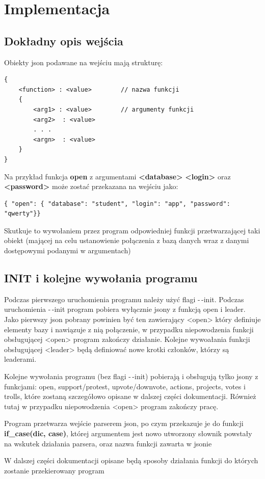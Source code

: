 \documentclass{article}
\begin{document}
\newpage
\section{Implementacja}




\subsection{Dokładny opis wejścia } 
Obiekty json podawane na wejściu mają strukturę: 
\begin{verbatim}
{     
    <function> : <value>        // nazwa funkcji 
    {
        <arg1> : <value>        // argumenty funkcji
        <arg2>  : <value> 
        . . . 
        <argn>  : <value> 
    }
}
\end{verbatim}
Na przykład funkcja \textbf{open} z argumentami \textbf{<database>} \textbf{<login>} oraz \textbf{<password>} może zostać przekazana na wejściu jako:
\begin{verbatim}
{ "open": { "database": "student", "login": "app", "password": "qwerty"}}
\end{verbatim}
Skutkuje to wywołaniem przez program odpowiedniej funkcji przetwarzającej taki obiekt (mającej na celu ustanowienie połączenia z bazą danych wraz z danymi dostępowymi podanymi w argumentach)




\subsection{INIT i kolejne wywołania programu}
Podczas pierwszego uruchomienia programu należy użyć flagi -\,-init.
Podczas uruchomienia -\,-init program pobiera wyłącznie jsony z funkcją open i leader.
Jako pierwszy json pobrany powinien być ten zawierający <open> który definiuje elementy bazy i nawiązuje z nią połączenie,
w przypadku niepowodzenia funkcji obsługującej <open> program zakończy działanie. \newline
Kolejne wywoałania funkcji obsługującej <leader> będą definiować nowe krotki członków, którzy są leaderami. 

Kolejne wywołania programu (bez flagi -\,-init) pobierają i obsługują tylko jsony z funkcjami: 
open, support/protest, upvote/downvote, actions, projects, votes i trolls, 
które zostaną szczegółowo opisane w dalszej części dokumentacji.
Również tutaj w przypadku niepowodzenia <open> program zakończy pracę.  

Program przetwarza wejście parserem json, po czym przekazuje je do funkcji \textbf{if\_case(dic, case)}, 
której argumentem jest nowo utworzony słownik powstały na wskutek działania parsera, oraz nazwa funkcji zawarta w jsonie

W dalszej części dokumentacji opisane będą sposoby działania funkcji do których zostanie przekierowany program

\newpage
\subsection{ }
\end{document}
